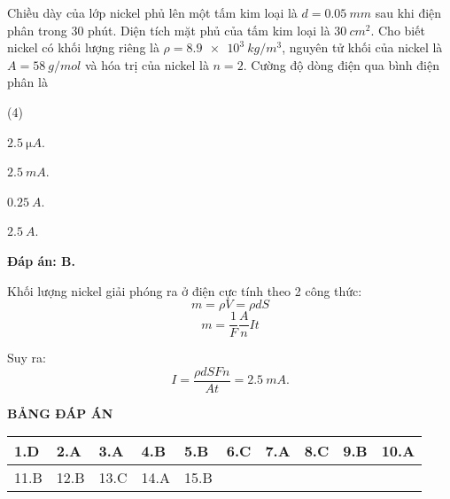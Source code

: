 \begin{enumerate}[label=\bfseries Câu \arabic*:]
	\cauhoi
	{Chiều dày của lớp nickel phủ lên một tấm kim loại là $d=\SI{0.05}{mm}$ sau khi điện phân trong 30 phút. Diện tích mặt phủ của tấm kim loại là $\SI{30}{cm^2}$. Cho biết nickel có khối lượng riêng là $\rho = \SI{8.9e3}{kg/m^3}$, nguyên tử khối của nickel là $A=\SI{58}{g/mol}$ và hóa trị của nickel là $n=2$. Cường độ dòng điện qua bình điện phân là
		
	}
	\loigiai
	{	\textbf{Đáp án: B.}
		
		Khối lượng nickel giải phóng ra ở điện cực tính theo 2 công thức:
		$$m = \rho V = \rho d S$$
		$$m=\dfrac{1}{F} \dfrac{A}{n} I t$$
		
		Suy ra:
		$$I=\dfrac{\rho d S F n}{A t} = \SI{2.5}{mA}.$$
	}
\end{enumerate}

\whiteBGstarEnd

\loigiai
{
	\begin{center}
		\textbf{BẢNG ĐÁP ÁN}
	\end{center}
	\begin{center}
		\begin{tabular}{|m{2.8em}|m{2.8em}|m{2.8em}|m{2.8em}|m{2.8em}|m{2.8em}|m{2.8em}|m{2.8em}|m{2.8em}|m{2.8em}|}
			\hline
			1.D  & 2.A  & 3.A  & 4.B  & 5.B  & 6.C  & 7.A  & 8.C  & 9.B  & 10.A  \\
			\hline
			11.B  & 12.B  & 13.C  & 14.A  & 15.B  & & & & & \\
			\hline
		\end{tabular}
	\end{center}
}

